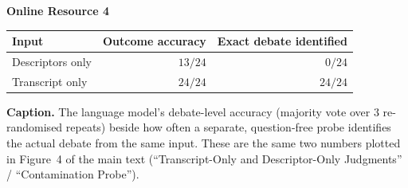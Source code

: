 \documentclass[12pt]{article}
\begin{document}
\begin{center}
\textbf{\large Online Resource 4}
\end{center}
\vspace{1em}

\begin{center}
\begin{tabular}{lrr}
\toprule
Input             & Outcome accuracy & Exact debate identified \\
\midrule
Descriptors only  & $13/24$          & $0/24$ \\
Transcript only   & $24/24$          & $24/24$ \\
\bottomrule
\end{tabular}
\end{center}

\vspace{1em}
\noindent\textbf{Caption.} The language model's debate-level accuracy
(majority vote over $3$ re-randomised repeats) beside how often a separate,
question-free probe identifies the actual debate from the same input. These
are the same two numbers plotted in Figure~4 of the main text
(``Transcript-Only and Descriptor-Only Judgments'' / ``Contamination
Probe'').
\end{document}
